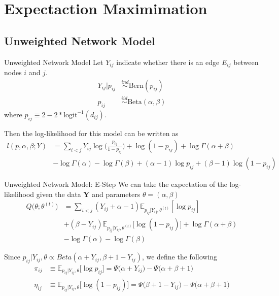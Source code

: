 \documentclass[handout]{beamer}
\begin{document}
\section{Expectaction Maximimation}


\subsection{Unweighted Network Model}
\begin{frame}{Unweighted Network Model}
Let $Y_{ij}$ indicate whether there is an edge $E_{ij}$ between nodes $i$ and $j$.
\begin{align*}
Y_{ij} | p_{ij} &\overset{ind}\sim \text{Bern}(p_{ij}) \\
p_{ij} &\overset{iid}\sim \text{Beta}(\alpha, \beta)
\end{align*}
where $p_{ij} \equiv 2-2*\text{logit}^{-1} (d_{ij})$. \newline

Then the log-likelihood for this model can be written as
\begin{align*}
l(p, \alpha, \beta ; Y) &= \sum_{i<j} Y_{ij}\log \Big(\frac{p_{ij}}{1 - p_{ij}}\Big) + \log(1-p_{ij})  + \log \Gamma(\alpha + \beta) \\
&- \log \Gamma(\alpha) - \log \Gamma(\beta) + (\alpha - 1)\log p_{ij} + (\beta - 1)\log(1 - p_{ij})
\end{align*}
\end{frame}

\begin{frame}{Unweighted Network Model: E-Step}
We can take the expectation of the log-likelihood given the data \textbf{Y} and parameters $\theta = (\alpha, \beta)$
\begin{align*}
Q\big(\theta; \theta^{(t)}\big) &= \sum_{i<j} (Y_{ij} + \alpha - 1) \mathbb{E}_{p_{ij} | Y_{ij}, \theta^{(t)}} [\log  p_{ij}] \\
&+ (\beta -Y_{ij}) \mathbb{E}_{p_{ij} | Y_{ij}, \theta^{(t)}} \big[\log (1-p_{ij})\big] + \log \Gamma(\alpha + \beta) \\
&- \log \Gamma(\alpha) - \log \Gamma(\beta) 
\end{align*}

Since $p_{ij}|Y_{ij}, \theta \propto Beta(\alpha + Y_{ij}, \beta + 1 - Y_{ij})$, we define the following 
\begin{align*}
\pi_{ij} &\equiv \mathbb{E}_{p_{ij} | Y_{ij}, \theta} \big[\log p_{ij}\big] = \Psi\Big(\alpha + Y_{ij}\Big) - \Psi\Big(\alpha + \beta + 1\Big) \\
\eta_{ij} &\equiv \mathbb{E}_{p_{ij} | Y_{ij}, \theta} \big[\log (1 - p_{ij})\big] = \Psi\Big(\beta + 1 - Y_{ij}\Big) - \Psi\Big(\alpha + \beta + 1\Big)
\end{align*}
\end{frame}
\end{document}
